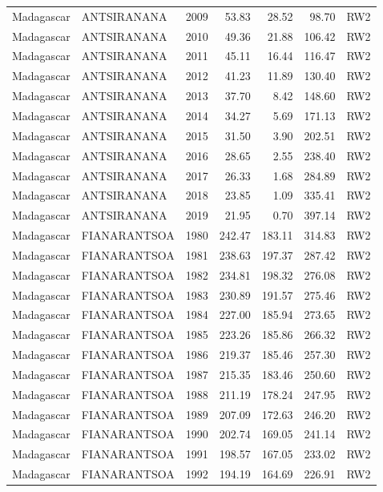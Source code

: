 \begin{longtable}{lllrrrl}
  Madagascar & ANTSIRANANA & 2009 & 53.83 & 28.52 & 98.70 & RW2 \\ 
  Madagascar & ANTSIRANANA & 2010 & 49.36 & 21.88 & 106.42 & RW2 \\ 
  Madagascar & ANTSIRANANA & 2011 & 45.11 & 16.44 & 116.47 & RW2 \\ 
  Madagascar & ANTSIRANANA & 2012 & 41.23 & 11.89 & 130.40 & RW2 \\ 
  Madagascar & ANTSIRANANA & 2013 & 37.70 & 8.42 & 148.60 & RW2 \\ 
  Madagascar & ANTSIRANANA & 2014 & 34.27 & 5.69 & 171.13 & RW2 \\ 
  Madagascar & ANTSIRANANA & 2015 & 31.50 & 3.90 & 202.51 & RW2 \\ 
  Madagascar & ANTSIRANANA & 2016 & 28.65 & 2.55 & 238.40 & RW2 \\ 
  Madagascar & ANTSIRANANA & 2017 & 26.33 & 1.68 & 284.89 & RW2 \\ 
  Madagascar & ANTSIRANANA & 2018 & 23.85 & 1.09 & 335.41 & RW2 \\ 
  Madagascar & ANTSIRANANA & 2019 & 21.95 & 0.70 & 397.14 & RW2 \\ 
  Madagascar & FIANARANTSOA & 1980 & 242.47 & 183.11 & 314.83 & RW2 \\ 
  Madagascar & FIANARANTSOA & 1981 & 238.63 & 197.37 & 287.42 & RW2 \\ 
  Madagascar & FIANARANTSOA & 1982 & 234.81 & 198.32 & 276.08 & RW2 \\ 
  Madagascar & FIANARANTSOA & 1983 & 230.89 & 191.57 & 275.46 & RW2 \\ 
  Madagascar & FIANARANTSOA & 1984 & 227.00 & 185.94 & 273.65 & RW2 \\ 
  Madagascar & FIANARANTSOA & 1985 & 223.26 & 185.86 & 266.32 & RW2 \\ 
  Madagascar & FIANARANTSOA & 1986 & 219.37 & 185.46 & 257.30 & RW2 \\ 
  Madagascar & FIANARANTSOA & 1987 & 215.35 & 183.46 & 250.60 & RW2 \\ 
  Madagascar & FIANARANTSOA & 1988 & 211.19 & 178.24 & 247.95 & RW2 \\ 
  Madagascar & FIANARANTSOA & 1989 & 207.09 & 172.63 & 246.20 & RW2 \\ 
  Madagascar & FIANARANTSOA & 1990 & 202.74 & 169.05 & 241.14 & RW2 \\ 
  Madagascar & FIANARANTSOA & 1991 & 198.57 & 167.05 & 233.02 & RW2 \\ 
  Madagascar & FIANARANTSOA & 1992 & 194.19 & 164.69 & 226.91 & RW2 \\ 

\end{longtable}
